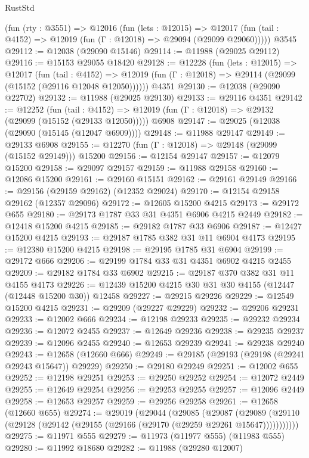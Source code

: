 \begin{lexlean}{RustStd}
\begin{coremodule}
    (fun (rty : @3551) =>
    @12016
      (fun (lets : @12015) =>
      @12017 (fun (tail : @4152) => @12019 (fun (Γ : @12018) => @29094 (@29099 @29060)))))
    @3545
@29112 := @12038 (@29090 @15146)
@29114 := @11988 (@29025 @29112)
@29116 := @15153 @29055 @18420
@29128 := @12228
    (fun (lets : @12015) =>
    @12017
      (fun (tail : @4152) =>
      @12019 (fun (Γ : @12018) => @29114 (@29099 (@15152 (@29116 @12048 @12050))))))
    @4351
@29130 := @12038 (@29090 @22702)
@29132 := @11988 (@29025 @29130)
@29133 := @29116 @4351
@29142 := @12252
    (fun (tail : @4152) => @12019 (fun (Γ : @12018) => @29132 (@29099 (@15152 (@29133 @12050)))))
    @6908
@29147 := @29025 (@12038 (@29090 (@15145 (@12047 @6909))))
@29148 := @11988 @29147
@29149 := @29133 @6908
@29155 := @12270 (fun (Γ : @12018) => @29148 (@29099 (@15152 @29149))) @15200
@29156 := @12154 @29147
@29157 := @12079 @15200
@29158 := @29097 @29157
@29159 := @11988 @29158
@29160 := @12086 @15200
@29161 := @29160 @15151
@29162 := @29161 @29149
@29166 := @29156 (@29159 @29162) (@12352 @29024)
@29170 := @12154 @29158 @29162 (@12357 @29096)
@29172 := @12605 @15200 @4215
@29173 := @29172 @655
@29180 := @29173 @1787 @33 @31 @4351 @6906 @4215 @2449
@29182 := @12418 @15200 @4215
@29185 := @29182 @1787 @33 @6906
@29187 := @12427 @15200 @4215
@29193 := @29187 @1785 @382 @31 @11 @6904 @4173
@29195 := @12380 @15200 @4215
@29198 := @29195 @1785 @31 @6904
@29199 := @29172 @666
@29206 := @29199 @1784 @33 @31 @4351 @6902 @4215 @2455
@29209 := @29182 @1784 @33 @6902
@29215 := @29187 @370 @382 @31 @11 @4155 @4173
@29226 := @12439 @15200 @4215 @30 @31 @30 @4155 (@12447 (@12448 @15200 @30)) @12458
@29227 := @29215 @29226
@29229 := @12549 @15200 @4215
@29231 := @29209 (@29227 @29229)
@29232 := @29206 @29231
@29233 := @12002 @666
@29234 := @12198 @29233
@29235 := @29232 @29234
@29236 := @12072 @2455
@29237 := @12649 @29236
@29238 := @29235 @29237
@29239 := @12096 @2455
@29240 := @12653 @29239
@29241 := @29238 @29240
@29243 := @12658 (@12660 @666)
@29249 := @29185 (@29193 (@29198 (@29241 @29243 @15647)) @29229)
@29250 := @29180 @29249
@29251 := @12002 @655
@29252 := @12198 @29251
@29253 := @29250 @29252
@29254 := @12072 @2449
@29255 := @12649 @29254
@29256 := @29253 @29255
@29257 := @12096 @2449
@29258 := @12653 @29257
@29259 := @29256 @29258
@29261 := @12658 (@12660 @655)
@29274 := @29019
    (@29044
      (@29085
        (@29087
          (@29089 (@29110 (@29128 (@29142 (@29155 (@29166 (@29170 (@29259 @29261 @15647)))))))))))
@29275 := @11971 @555
@29279 := @11973 (@11977 @555) (@11983 @555)
@29280 := @11992 @18680
@29282 := @11988 (@29280 @12007)

\end{coremodule}
\end{lexlean}
